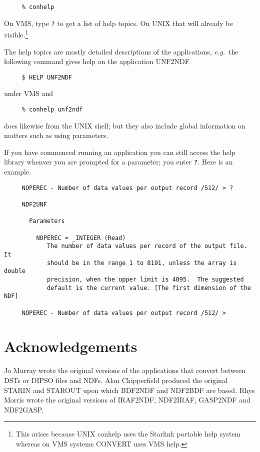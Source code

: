 \vspace{-\bigskipamount}
\small
\begin{verbatim}
     % conhelp
\end{verbatim}
\normalsize

On VMS, type {\tt ?} to get a list of
help topics.  On UNIX that will already be visible.\footnote{This
arises because UNIX conhelp uses the Starlink portable help system
whereas on VMS systems CONVERT uses VMS help.} 

The help topics are mostly detailed descriptions of the applications,
{\it e.g.}\ the following command gives help on the application UNF2NDF

\small
\begin{verbatim}
     $ HELP UNF2NDF
\end{verbatim}
\normalsize
under VMS and

\small
\begin{verbatim}
     % conhelp unf2ndf
\end{verbatim}
\normalsize
does likewise from the UNIX shell; but they also include global
information on matters such as using parameters. 

If you have commenced running an application you can still access the
help library whenver you are prompted for a parameter; you enter {\tt ?}.
Here is an example.

\small
\begin{verbatim}
     NOPEREC - Number of data values per output record /512/ > ?

     NDF2UNF

       Parameters

         NOPEREC = _INTEGER (Read)
            The number of data values per record of the output file.  It
            should be in the range 1 to 8191, unless the array is double
            precision, when the upper limit is 4095.  The suggested
            default is the current value. [The first dimension of the NDF]

     NOPEREC - Number of data values per output record /512/ > 
\end{verbatim}
\normalsize
 
\section{Acknowledgements}
Jo Murray wrote the original versions of the applications that convert
between DSTs or DIPSO files and NDFs.  Alan Chipperfield produced the
original STARIN and STAROUT upon which BDF2NDF and NDF2BDF are based.
Rhys Morris wrote the original versions of IRAF2NDF, NDF2IRAF, GASP2NDF
and NDF2GASP.

